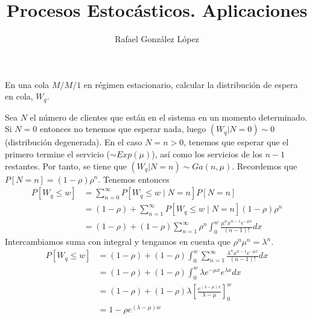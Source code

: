 \documentclass[twoside]{article}
\begin{document}
\title{Procesos Estocásticos. Aplicaciones}
\author{Rafael González López}
\maketitle
\begin{ejercicio}{1} En una cola $M/M/1$ en régimen estacionario, calcular la distribución de espera en cola, $W_{q}$.
\end{ejercicio}
\begin{solucion}
Sea $N$ el número de clientes que están en el sistema en un momento determinado. Si $N=0$ entonces no tenemos que esperar nada, luego $(W_q|N=0) \sim 0$ (distribución degenerada). En el caso $N = n >0$, tenemos que esperar que el primero termine el servicio ($\sim Exp(\mu)$), así como los servicios de los $n-1$ restantes. Por tanto, se tiene que $(W_q|N=n)\sim Ga(n,\mu)$. Recordemos que $P[N=n] = (1-\rho)\rho^n$. Tenemos entonces
\begin{align*}
P[W_q \leq w] &= \sum_{n=0}^\infty P[W_q \leq w \mid N=n]P[N=n]\\
&=(1-\rho) + \sum_{n=1}^\infty P[W_q \leq w \mid N=n](1-\rho)\rho^n\\
&=(1-\rho) + (1-\rho)\sum_{n=1}^\infty \rho^n \int_0^w \frac{\mu^n x^{n-1}e^{-\mu x}}{(n-1)!}dx
\end{align*}
Intercambiamos suma con integral y tengamos en cuenta que $\rho^n \mu^n = \lambda^n$.
\begin{align*}
P[W_q\leq w] &=(1-\rho) + (1-\rho) \int_0^w \sum_{n=1}^\infty \frac{\lambda^n x^{n-1}e^{-\mu x}}{(n-1)!}dx\\
&= (1-\rho) + (1-\rho)\int^w_0 \lambda e^{-\mu x}e^{\lambda x}dx\\
&= (1-\rho) + (1-\rho)\lambda \left[\frac{e^{(\lambda-\mu)x}}{\lambda-\mu}\right]_0^w\\
&= 1-\rho e^{(\lambda-\mu)w}
\end{align*}
\end{solucion}
\newpage
\end{document}
